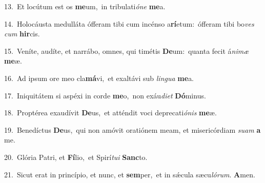 {\numbfont\textcolor{\numbcolor}{13.}}~Et locútum est os \textbf{me}\-um,~\star in tribulati\-\textit{ó}\-\textit{ne} \textbf{me}\-a.\par
{\numbfont\textcolor{\numbcolor}{14.}}~Holocáusta medulláta ófferam tibi cum incénso a\-\textbf{rí}\-etum:~\star ófferam tibi bo\textit{ves} \textit{cum} \textbf{hir}\-cis.\par
{\numbfont\textcolor{\numbcolor}{15.}}~Veníte, audíte, et narrábo, omnes, qui timétis \textbf{De}\-um:~\star quanta fecit á\-\textit{ni}\-\textit{mæ} \textbf{me}\-æ.\par
{\numbfont\textcolor{\numbcolor}{16.}}~Ad ipsum ore meo cla\-\textbf{má}\-vi,~\star et exaltávi sub \textit{lin}\-\textit{gua} \textbf{me}\-a.\par
{\numbfont\textcolor{\numbcolor}{17.}}~Iniquitátem si aspéxi in corde \textbf{me}\-o,~\star non exáu\-\textit{di}\-\textit{et} \textbf{Dó}\-minus.\par
{\numbfont\textcolor{\numbcolor}{18.}}~Proptérea exaudívit \textbf{De}\-us,~\star et atténdit voci deprecati\-\textit{ó}\-\textit{nis} \textbf{me}\-æ.\par
{\numbfont\textcolor{\numbcolor}{19.}}~Benedíctus \textbf{De}\-us,~\star qui non amóvit oratiónem meam, et misericórdiam \textit{su}\-\textit{am} \textbf{a} me.\par
{\numbfont\textcolor{\numbcolor}{20.}}~Glória Patri, et \textbf{Fí}\-lio,~\star et Spirí\-\textit{tu}\-\textit{i} \textbf{Sanc}\-to.\par
{\numbfont\textcolor{\numbcolor}{21.}}~Sicut erat in princípio, et nunc, et \textbf{sem}\-per,~\star et in sǽcula sæcu\-\textit{ló}\-\textit{rum}. \textbf{A}\-men.\par
